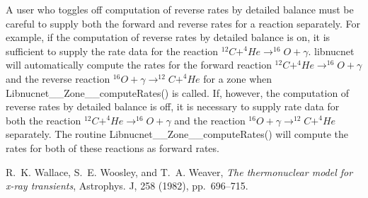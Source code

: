 \documentclass{article}    %
\def\apj{Astrophys. J}
\begin{document}
A user who toggles off computation of reverse rates by detailed balance must
be careful to supply both the forward and reverse rates for a reaction
separately.  For example, if the computation of reverse rates by detailed
balance is on, it is sufficient to supply the rate data for the reaction
\mbox{$^{12}C + ^4He \to ^{16}O + \gamma$}.
libnucnet will automatically
compute the rates for the forward reaction 
\mbox{$^{12}C + ^4He \to ^{16}O + \gamma$} and the reverse reaction
\mbox{$^{16}O + \gamma \to ^{12}C + ^4He$} for a zone when
Libnucnet\_\_Zone\_\_computeRates() is called.  If, however, the computation
of reverse rates by detailed balance is off, it is necessary to supply
rate data for both the reaction
\mbox{$^{12}C + ^4He \to ^{16}O + \gamma$} and the reaction
\mbox{$^{16}O + \gamma \to ^{12}C + ^4He$} separately.  The routine
Libnucnet\_\_Zone\_\_computeRates() will compute the rates for both of these
reactions as forward rates.

\begin{thebibliography}{1}

{\sc R.~K. {Wallace}, S.~E. {Woosley}, and T.~A. {Weaver}}, {\em The
  thermonuclear model for x-ray transients}, \apj, 258 (1982), pp.~696--715.

\end{thebibliography}
\end{document}
